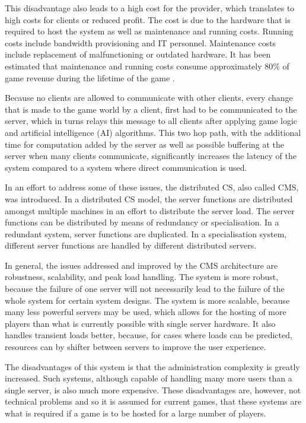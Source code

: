 \documentclass[journal,oneside,a4paper,onecolumn]{IEEEtran}
\begin{document}
This disadvantage also leads to a high cost for the provider, which translates to high costs for clients or reduced profit. The cost is due to the hardware that is required to host the system as well as maintenance and running costs. Running costs include bandwidth provisioning and IT personnel. Maintenance costs include replacement of malfunctioning or outdated hardware. It has been estimated that maintenance and running costs consume approximately 80\% of game revenue during the lifetime of the game \cite{cs_mmog_cost}.

Because no clients are allowed to communicate with other clients, every change that is made to the game world by a client, first had to be communicated to the server, which in turns relays this message to all clients after applying game logic and artificial intelligence (AI) algorithms. This two hop path, with the additional time for computation added by the server as well as possible buffering at the server when many clients communicate, significantly increases the latency of the system compared to a system where direct communication is used.

In an effort to address some of these issues, the distributed \ac{CS}, also called \ac{CMS}, was introduced. In a distributed \ac{CS} model, the server functions are distributed amongst multiple machines in an effort to distribute the server load. The server functions can be distributed by means of redundancy or specialisation. In a redundant system, server functions are duplicated. In a specialisation system, different server functions are handled by different distributed servers.

In general, the issues addressed and improved by the \ac{CMS} architecture are robustness, scalability, and peak load handling. The system is more robust, because the failure of one server will not necessarily lead to the failure of the whole system for certain system designs. The system is more scalable, because many less powerful servers may be used, which allows for the hosting of more players than what is currently possible with single server hardware. It also handles transient loads better, because, for cases where loads can be predicted, resources can by shifter between servers to improve the user experience.

The disadvantages of this system is that the administration complexity is greatly increased. Such systems, although capable of handling many more users than a single server, is also much more expensive. These disadvantages are, however, not technical problems and so it is assumed for current games, that these systems are what is required if a game is to be hosted for a large number of players.
\end{document}
